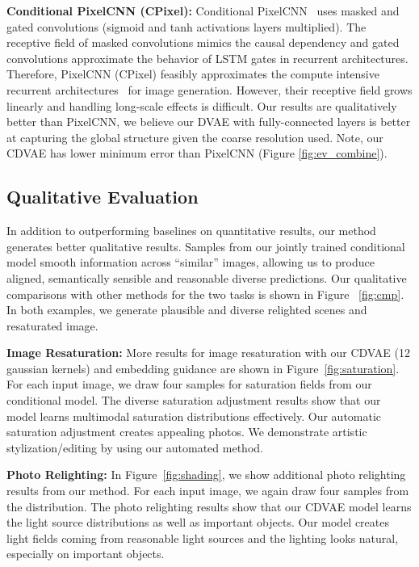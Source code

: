 \documentclass[10pt,twocolumn,letterpaper]{article}
\begin{document}
\textbf{Conditional PixelCNN (CPixel):} Conditional PixelCNN~\cite{oord2016conditional} uses masked
and gated convolutions (sigmoid and tanh activations layers multiplied). The 
receptive field of masked convolutions mimics the causal dependency and gated convolutions
approximate the behavior of LSTM gates in recurrent architectures. Therefore, PixelCNN (CPixel) 
feasibly approximates the compute intensive recurrent architectures~\cite{gregor2015draw} for 
image generation. However, their receptive field grows linearly and handling long-scale effects 
is difficult. Our results are qualitatively better than PixelCNN, we believe our DVAE with 
fully-connected layers is better at capturing the global structure given the coarse resolution 
used. Note, our CDVAE has lower minimum error than PixelCNN (Figure \ref{fig:ev_combine}).





\subsection{Qualitative Evaluation}
\label{sec:qual} 

In addition to outperforming baselines on quantitative results, our method generates better
qualitative results. Samples from our jointly trained conditional model smooth information
across ``similar'' images, allowing us to produce aligned, semantically sensible and 
reasonable diverse predictions.  Our qualitative comparisons with other methods for the two tasks 
is shown in Figure ~\ref{fig:cmp}.  In both examples, we generate plausible and diverse relighted 
scenes and resaturated image. 

\textbf{Image Resaturation:} More results for image resaturation with our CDVAE (12 gaussian
kernels) and embedding guidance are shown in Figure~\ref{fig:saturation}. For each input image, we draw four 
samples for saturation fields from our conditional model. The diverse saturation adjustment results show 
that our model learns multimodal saturation distributions effectively. Our automatic saturation 
adjustment creates appealing photos. We demonstrate artistic stylization/editing by using our 
automated method. 


\textbf{Photo Relighting:}  In Figure~\ref{fig:shading}, we show additional photo relighting 
results from our method. For each input image, we again draw four samples from the distribution. The 
photo relighting results show that our CDVAE model learns the light source distributions as well 
as important objects. Our model creates light fields coming from reasonable light sources and 
the lighting looks natural, especially on important objects. 
\end{document}
